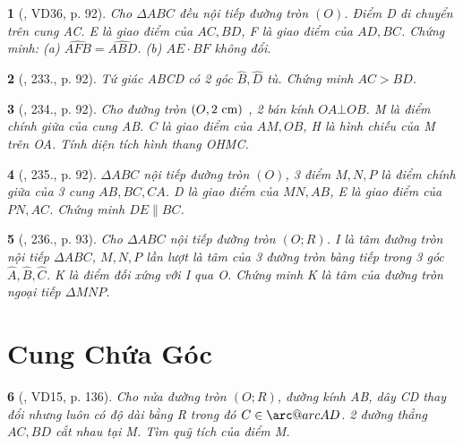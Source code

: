 \documentclass{article}
\makeatletter
\newcommand{\arc@char}{{\usefont{U}{tipa}{m}{n}\symbol{62}}}%
\newcommand{\arc}[1]{\mathpalette\arc@arc{#1}}
\newcommand{\arc@arc}[2]{%
	\sbox0{$\m@th#1#2$}%
	\vbox{
		\hbox{\resizebox{\wd0}{\height}{\arc@char}}
		\nointerlineskip
		\box0
	}%
}
\newtheorem{baitoan}{}
\makeatother
\begin{document}
\begin{baitoan}[\cite{Binh_Toan_9_tap_2}, VD36, p. 92]
	Cho $\Delta ABC$ đều nội tiếp đường tròn $(O)$. Điểm D di chuyển trên cung AC. E là giao điểm của $AC,BD$, F là giao điểm của $AD,BC$. Chứng minh: (a) $\widehat{AFB} = \widehat{ABD}$. (b) $AE\cdot BF$ không đổi.
\end{baitoan}

\begin{baitoan}[\cite{Binh_Toan_9_tap_2}, 233., p. 92]
	Tứ giác ABCD có 2 góc $\widehat{B},\widehat{D}$ tù. Chứng minh $AC > BD$.
\end{baitoan}

\begin{baitoan}[\cite{Binh_Toan_9_tap_2}, 234., p. 92]
	Cho đường tròn $(O,2\ {\rm cm})$ , 2 bán kính $OA\bot OB$. M là điểm chính giữa của cung AB. C là giao điểm của $AM,OB$, H là hình chiếu của M trên OA. Tính diện tích hình thang OHMC.
\end{baitoan}

\begin{baitoan}[\cite{Binh_Toan_9_tap_2}, 235., p. 92]
	$\Delta ABC$ nội tiếp đường tròn $(O)$, 3 điểm $M,N,P$ là điểm chính giữa của 3 cung $AB,BC,CA$. D là giao điểm của $MN,AB$, E là giao điểm của $PN,AC$. Chứng minh $DE\parallel BC$.
\end{baitoan}

\begin{baitoan}[\cite{Binh_Toan_9_tap_2}, 236., p. 93]
	Cho $\Delta ABC$ nội tiếp đường tròn $(O;R)$. I là tâm đường tròn nội tiếp $\Delta ABC$, $M,N,P$ lần lượt là tâm của 3 đường tròn bàng tiếp trong 3 góc $\widehat{A},\widehat{B},\widehat{C}$. K là điểm đối xứng với I qua O. Chứng minh K là tâm của đường tròn ngoại tiếp $\Delta MNP$.
\end{baitoan}


\section{Cung Chứa Góc}

\begin{baitoan}[\cite{Tuyen_Toan_9_old}, VD15, p. 136]
	Cho nửa đường tròn $(O;R)$, đường kính AB, dây CD thay đổi nhưng luôn có độ dài bằng R trong đó $C\in\arc{AD}$. 2 đường thẳng $AC,BD$ cắt nhau tại M. Tìm quỹ tích của điểm M.
\end{baitoan}
\end{document}
